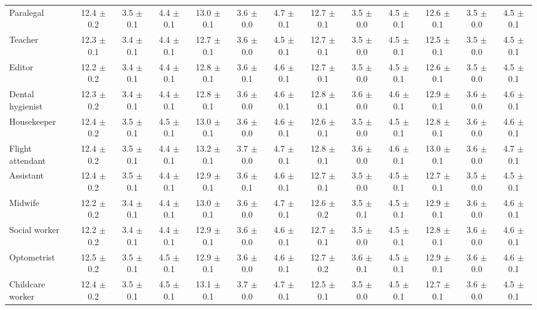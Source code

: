 \begin{table*}[p]
{\begin{tabular}{l|ccc|ccc|ccc|ccc}
Paralegal
& 12.4 $\pm$ 0.2 & 3.5 $\pm$ 0.1 & 4.4 $\pm$ 0.1 & 13.0 $\pm$ 0.1 & 3.6 $\pm$ 0.0 & 4.7 $\pm$ 0.1 & 12.7 $\pm$ 0.1 & 3.5 $\pm$ 0.0 & 4.5 $\pm$ 0.1 & 12.6 $\pm$ 0.1 & 3.5 $\pm$ 0.0 & 4.5 $\pm$ 0.1 \\
Teacher
& 12.3 $\pm$ 0.1 & 3.4 $\pm$ 0.1 & 4.4 $\pm$ 0.1 & 12.7 $\pm$ 0.1 & 3.6 $\pm$ 0.0 & 4.5 $\pm$ 0.1 & 12.7 $\pm$ 0.1 & 3.5 $\pm$ 0.0 & 4.5 $\pm$ 0.1 & 12.5 $\pm$ 0.1 & 3.5 $\pm$ 0.0 & 4.5 $\pm$ 0.1 \\
Editor
& 12.2 $\pm$ 0.2 & 3.4 $\pm$ 0.1 & 4.4 $\pm$ 0.1 & 12.8 $\pm$ 0.1 & 3.6 $\pm$ 0.1 & 4.6 $\pm$ 0.1 & 12.7 $\pm$ 0.1 & 3.5 $\pm$ 0.0 & 4.5 $\pm$ 0.1 & 12.6 $\pm$ 0.1 & 3.5 $\pm$ 0.0 & 4.5 $\pm$ 0.1 \\
Dental hygienist
& 12.3 $\pm$ 0.2 & 3.4 $\pm$ 0.1 & 4.4 $\pm$ 0.1 & 12.8 $\pm$ 0.1 & 3.6 $\pm$ 0.0 & 4.6 $\pm$ 0.1 & 12.8 $\pm$ 0.1 & 3.6 $\pm$ 0.0 & 4.6 $\pm$ 0.1 & 12.9 $\pm$ 0.1 & 3.6 $\pm$ 0.0 & 4.6 $\pm$ 0.1 \\
Housekeeper
& 12.4 $\pm$ 0.2 & 3.5 $\pm$ 0.1 & 4.5 $\pm$ 0.1 & 13.0 $\pm$ 0.1 & 3.6 $\pm$ 0.0 & 4.6 $\pm$ 0.1 & 12.6 $\pm$ 0.1 & 3.5 $\pm$ 0.0 & 4.5 $\pm$ 0.1 & 12.8 $\pm$ 0.1 & 3.6 $\pm$ 0.0 & 4.6 $\pm$ 0.1 \\
Flight attendant
& 12.4 $\pm$ 0.2 & 3.5 $\pm$ 0.1 & 4.4 $\pm$ 0.1 & 13.2 $\pm$ 0.1 & 3.7 $\pm$ 0.0 & 4.7 $\pm$ 0.1 & 12.8 $\pm$ 0.1 & 3.6 $\pm$ 0.0 & 4.6 $\pm$ 0.1 & 13.0 $\pm$ 0.1 & 3.6 $\pm$ 0.0 & 4.7 $\pm$ 0.1 \\
Assistant
& 12.4 $\pm$ 0.2 & 3.5 $\pm$ 0.1 & 4.4 $\pm$ 0.1 & 12.9 $\pm$ 0.1 & 3.6 $\pm$ 0.1 & 4.6 $\pm$ 0.1 & 12.7 $\pm$ 0.1 & 3.5 $\pm$ 0.0 & 4.5 $\pm$ 0.1 & 12.7 $\pm$ 0.1 & 3.5 $\pm$ 0.0 & 4.5 $\pm$ 0.1 \\
Midwife
& 12.2 $\pm$ 0.2 & 3.4 $\pm$ 0.1 & 4.4 $\pm$ 0.1 & 13.0 $\pm$ 0.1 & 3.6 $\pm$ 0.0 & 4.7 $\pm$ 0.1 & 12.6 $\pm$ 0.2 & 3.5 $\pm$ 0.1 & 4.5 $\pm$ 0.1 & 12.9 $\pm$ 0.1 & 3.6 $\pm$ 0.0 & 4.6 $\pm$ 0.1 \\
Social worker
& 12.2 $\pm$ 0.2 & 3.4 $\pm$ 0.1 & 4.4 $\pm$ 0.1 & 12.9 $\pm$ 0.1 & 3.6 $\pm$ 0.0 & 4.6 $\pm$ 0.1 & 12.7 $\pm$ 0.1 & 3.5 $\pm$ 0.0 & 4.5 $\pm$ 0.1 & 12.8 $\pm$ 0.1 & 3.6 $\pm$ 0.0 & 4.6 $\pm$ 0.1 \\
Optometrist
& 12.5 $\pm$ 0.2 & 3.5 $\pm$ 0.1 & 4.5 $\pm$ 0.1 & 12.9 $\pm$ 0.1 & 3.6 $\pm$ 0.0 & 4.6 $\pm$ 0.1 & 12.7 $\pm$ 0.2 & 3.6 $\pm$ 0.1 & 4.5 $\pm$ 0.1 & 12.9 $\pm$ 0.1 & 3.6 $\pm$ 0.0 & 4.6 $\pm$ 0.1 \\
Childcare worker
& 12.4 $\pm$ 0.2 & 3.5 $\pm$ 0.1 & 4.5 $\pm$ 0.1 & 13.1 $\pm$ 0.1 & 3.7 $\pm$ 0.0 & 4.7 $\pm$ 0.1 & 12.5 $\pm$ 0.1 & 3.5 $\pm$ 0.0 & 4.5 $\pm$ 0.1 & 12.7 $\pm$ 0.1 & 3.6 $\pm$ 0.0 & 4.5 $\pm$ 0.1 \\

\end{tabular}}
\end{table*}
